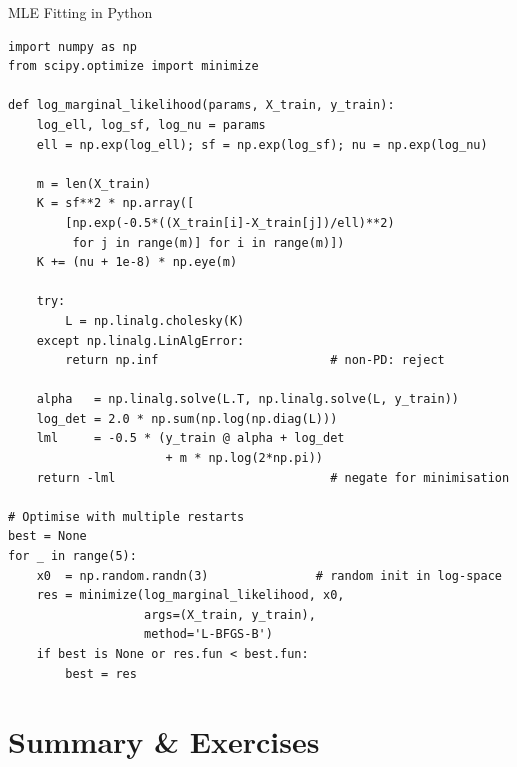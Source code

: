 \documentclass[aspectratio=169,10pt]{beamer}
\begin{document}
\begin{frame}[fragile]{MLE Fitting in Python}
\begin{lstlisting}
import numpy as np
from scipy.optimize import minimize

def log_marginal_likelihood(params, X_train, y_train):
    log_ell, log_sf, log_nu = params
    ell = np.exp(log_ell); sf = np.exp(log_sf); nu = np.exp(log_nu)

    m = len(X_train)
    K = sf**2 * np.array([
        [np.exp(-0.5*((X_train[i]-X_train[j])/ell)**2)
         for j in range(m)] for i in range(m)])
    K += (nu + 1e-8) * np.eye(m)

    try:
        L = np.linalg.cholesky(K)
    except np.linalg.LinAlgError:
        return np.inf                        # non-PD: reject

    alpha   = np.linalg.solve(L.T, np.linalg.solve(L, y_train))
    log_det = 2.0 * np.sum(np.log(np.diag(L)))
    lml     = -0.5 * (y_train @ alpha + log_det
                      + m * np.log(2*np.pi))
    return -lml                              # negate for minimisation

# Optimise with multiple restarts
best = None
for _ in range(5):
    x0  = np.random.randn(3)               # random init in log-space
    res = minimize(log_marginal_likelihood, x0,
                   args=(X_train, y_train),
                   method='L-BFGS-B')
    if best is None or res.fun < best.fun:
        best = res
\end{lstlisting}
\end{frame}

\section{Summary \& Exercises}
\end{document}
